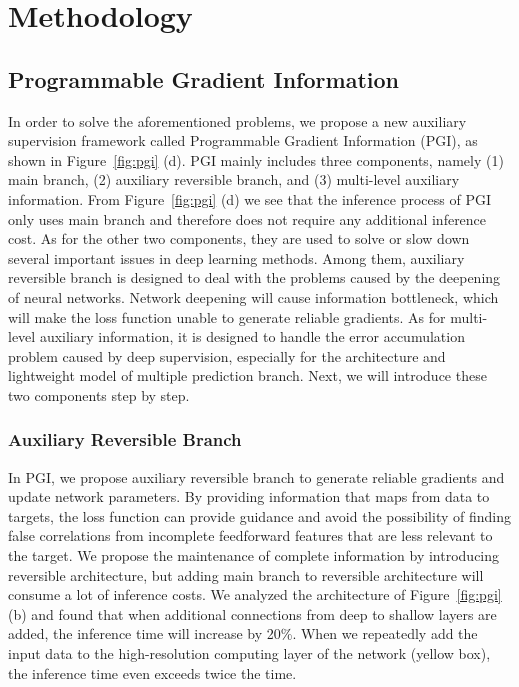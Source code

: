 \documentclass[10pt,twocolumn,letterpaper]{article}
\begin{document}
	
	\newpage
	
	\section{Methodology}
	
	\subsection{Programmable Gradient Information}
	
	In order to solve the aforementioned problems, we propose a new auxiliary supervision framework called Programmable Gradient Information (PGI), as shown in Figure~\ref{fig:pgi} (d).  PGI mainly includes three components, namely (1) main branch, (2) auxiliary reversible branch, and (3) multi-level auxiliary information.  From Figure~\ref{fig:pgi} (d) we see that the inference process of PGI only uses main branch and therefore does not require any additional inference cost.  As for the other two components, they are used to solve or slow down several important issues in deep learning methods.  Among them, auxiliary reversible branch is designed to deal with the problems caused by the deepening of neural networks. Network deepening will cause information bottleneck, which will make the loss function unable to generate reliable gradients.  As for multi-level auxiliary information, it is designed to handle the error accumulation problem caused by deep supervision, especially for the architecture and lightweight model of multiple prediction branch.  Next, we will introduce these two components step by step.
	
	\subsubsection{Auxiliary Reversible Branch}
	
	In PGI, we propose auxiliary reversible branch to generate reliable gradients and update network parameters.  By providing information that maps from data to targets, the loss function can provide guidance and avoid the possibility of finding false correlations from incomplete feedforward features that are less relevant to the target.  We propose the maintenance of complete information by introducing reversible architecture, but adding main branch to reversible architecture will consume a lot of inference costs.  We analyzed the architecture of Figure~\ref{fig:pgi} (b) and found that when additional connections from deep to shallow layers are added, the inference time will increase by 20\%.  When we repeatedly add the input data to the high-resolution computing layer of the network (yellow box), the inference time even exceeds twice the time.
	
\end{document}
